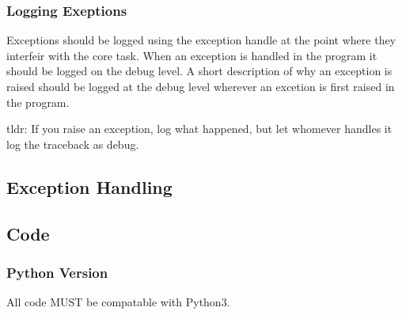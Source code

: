 \subsubsection*{Logging Exeptions}

Exceptions should be logged using the exception handle at the point where they interfeir with the core task. When an exception is handled in the program it should be logged on the debug level. A short description of why an exception is raised should be logged at the debug level wherever an excetion is first raised in the program.

tldr\-: If you raise an exception, log what happened, but let whomever handles it log the traceback as debug.

\subsection*{Exception Handling}

\subsection*{Code}

\subsubsection*{Python Version}

All code M\-U\-S\-T be compatable with Python3. 